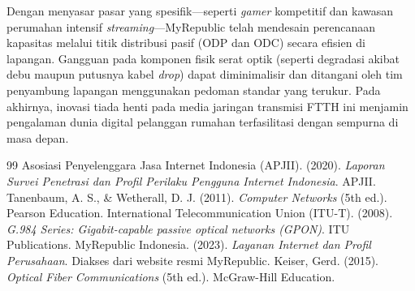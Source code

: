 \documentclass[12pt,a4paper]{article}
\begin{document}
Dengan menyasar pasar yang spesifik—seperti \textit{gamer} kompetitif dan kawasan perumahan intensif \textit{streaming}—MyRepublic telah mendesain perencanaan kapasitas melalui titik distribusi pasif (ODP dan ODC) secara efisien di lapangan. Gangguan pada komponen fisik serat optik (seperti degradasi akibat debu maupun putusnya kabel \textit{drop}) dapat diminimalisir dan ditangani oleh tim penyambung lapangan menggunakan pedoman standar yang terukur. Pada akhirnya, inovasi tiada henti pada media jaringan transmisi FTTH ini menjamin pengalaman dunia digital pelanggan rumahan terfasilitasi dengan sempurna di masa depan.

\newpage

\begin{thebibliography}{99}
     Asosiasi Penyelenggara Jasa Internet Indonesia (APJII). (2020). \textit{Laporan Survei Penetrasi dan Profil Perilaku Pengguna Internet Indonesia}. APJII.
     Tanenbaum, A. S., \& Wetherall, D. J. (2011). \textit{Computer Networks} (5th ed.). Pearson Education.
     International Telecommunication Union (ITU-T). (2008). \textit{G.984 Series: Gigabit-capable passive optical networks (GPON)}. ITU Publications.
     MyRepublic Indonesia. (2023). \textit{Layanan Internet dan Profil Perusahaan}. Diakses dari website resmi MyRepublic.
     Keiser, Gerd. (2015). \textit{Optical Fiber Communications} (5th ed.). McGraw-Hill Education.
\end{thebibliography}
\end{document}
